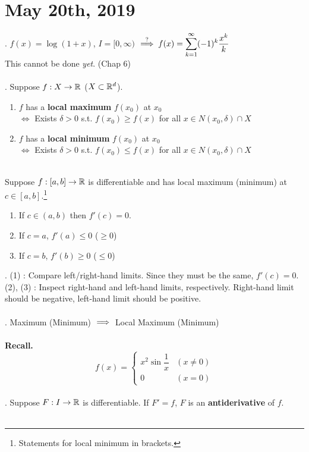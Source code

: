 \section*{May 20th, 2019}

\ex. $f(x) = \log(1+x)$, $I=[0, \infty)$ $\overset{?}{\implies} f(x) = \displaystyle \sum_{k=1}^\infty (-1)^k\dfrac{x^k}{k}$\\
This cannot be done \textit{yet}. (Chap 6)\\
\\
. Suppose $f: X\rightarrow \mathbb{R}$ ($X\subset \mathbb{R}^d$).
\begin{enumerate}
	\item $f$ has a \textbf{local maximum} $f(x_0)$ at $x_0$ \\
	$\iff$ Exists $\delta > 0$ s.t. $f(x_0) \geq f(x)$ for all $x\in N(x_0, \delta)\cap X$ 
	\item $f$ has a \textbf{local minimum} $f(x_0)$ at $x_0$ \\
	$\iff$ Exists $\delta > 0$ s.t. $f(x_0) \leq f(x)$ for all $x\in N(x_0, \delta)\cap X$ 
\end{enumerate}~\\
 Suppose $f:[a, b]\rightarrow \mathbb{R}$ is differentiable and has local maximum (minimum) at $c\in [a, b]$.\footnote{Statements for local minimum in brackets.}
\begin{enumerate}
	\item If $c\in (a, b)$ then $f'(c) = 0$.
	\item If $c = a$, $f'(a) \leq 0$ ($\geq 0$)
	\item If $c = b$, $f'(b) \geq 0$ ($\leq 0$)
\end{enumerate}
\pf. (1) : Compare left/right-hand limits. Since they must be the same, $f'(c) = 0$.\\
(2), (3) : Inspect right-hand and left-hand limits, respectively. Right-hand limit should be negative, left-hand limit should be positive.\\
\\
\rmk. Maximum (Minimum) $\implies$ Local Maximum (Minimum)\\
\\
\textbf{Recall.} $$f(x) = \begin{cases}
x^2\sin\dfrac{1}{x} & (x \neq 0)\\
0 & (x= 0)
\end{cases}$$
\\
. Suppose $F:I\rightarrow \mathbb{R}$ is differentiable. If $F'=f$, $F$ is an \textbf{antiderivative} of $f$.\\
\\
